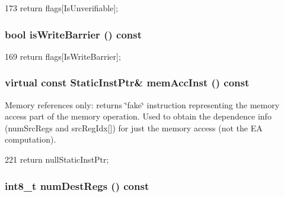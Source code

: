 \begin{DoxyCode}
173 { return flags[IsUnverifiable]; }
\end{DoxyCode}
\hypertarget{classStaticInst_aadc753a9e3a0d5bb33b6551fb3ad5f7e}{
\subsubsection[{isWriteBarrier}]{\setlength{\rightskip}{0pt plus 5cm}bool isWriteBarrier () const}}
\label{classStaticInst_aadc753a9e3a0d5bb33b6551fb3ad5f7e}



\begin{DoxyCode}
169 { return flags[IsWriteBarrier]; }
\end{DoxyCode}
\hypertarget{classStaticInst_ad80579a806c548f2fc2ec4fd12236f36}{
\subsubsection[{memAccInst}]{\setlength{\rightskip}{0pt plus 5cm}virtual const {\bf StaticInstPtr}\& memAccInst () const}}
\label{classStaticInst_ad80579a806c548f2fc2ec4fd12236f36}
Memory references only: returns \char`\"{}fake\char`\"{} instruction representing the memory access part of the memory operation. Used to obtain the dependence info (numSrcRegs and srcRegIdx\mbox{[}\mbox{]}) for just the memory access (not the EA computation). 


\begin{DoxyCode}
221 { return nullStaticInstPtr; }
\end{DoxyCode}
\hypertarget{classStaticInst_ab7e23352b3d45a982dfeb799030f87d0}{
\subsubsection[{numDestRegs}]{\setlength{\rightskip}{0pt plus 5cm}int8\_\-t numDestRegs () const}}
\label{classStaticInst_ab7e23352b3d45a982dfeb799030f87d0}


